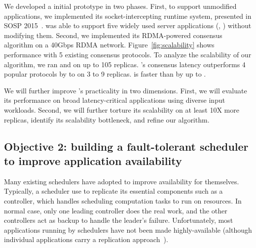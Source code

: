 
 We developed a \falcon initial prototype in two 
phases. First, to support unmodified applications, we implemented its 
socket-intercepting runtime system, presented in SOSP 2015~\cite{crane:sosp15}. 
\falcon was able to support five widely used server applications (\eg, \mysql) 
without modifying them. Second, we implemented its RDMA-powered consensus 
algorithm on a 40Gbps RDMA network. Figure~\ref{fig:scalability} shows \falcon 
performance with 5 existing consensus protocols. To analyze the scalability
of our algorithm, we ran \falcon and \dare on up to 105 replicas. \falcon's 
consensus latency outperforms 4 popular \paxos  protocols by \comptradlow to 
\comptradhigh on 3 to 9 replicas. \falcon is  faster than \dare by up to 
\fasterDARE.



 We will further improve \falcon's practicality in two 
dimensions. First, we will evaluate its performance on broad latency-critical 
applications using diverse input workloads. Second, we will further torture its 
scalability on at least 10X more replicas, identify its scalability 
bottleneck, and refine our algorithm. 

\vspace{-.15in}\subsection{Objective 2: 
building a fault-tolerant scheduler to improve 
application availability}\label{sec:scheduler}\vspace{-.075in}

Many existing schedulers have adopted \paxos to improve availability for 
themselves. Typically, a scheduler use \paxos to replicate its essential 
components such as a controller, which handles scheduling computation tasks 
to run on resources. In normal case, only one leading controller does the real 
work, and the other controllers act as backup to handle the leader's failure. 
Unfortunately, most applications running by schedulers have not been made 
highly-available (although individual applications carry a replication 
approach~\cite{mapreduce,dolly:nsdi13}).

